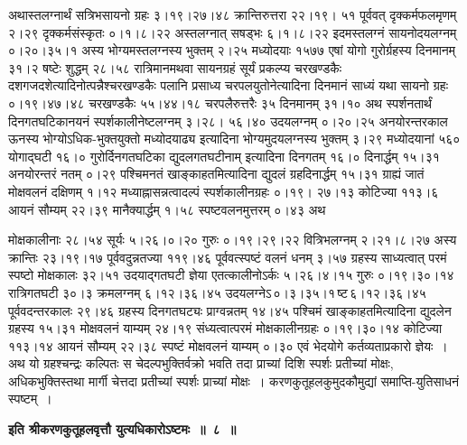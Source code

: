 \documentclass[11pt, openany]{book}
\begin{document}
\begin{sloppypar}
\noindent अथास्तलग्नार्थं सत्रिभसायनो ग्रहः ३।१९।२७।४८ क्रान्तिरुत्तरा २२।१९। ५१ पूर्ववत् दृक्कर्मफलमृणम् २।२९ दृक्कर्मसंस्कृतः ०।१।८।२२ अस्तलग्नात् सषड्भः ६।१।८।२२ इदमस्तलग्नं सायनोदयलग्नम् ०।२०।३५।१ अस्य भोग्यमस्तलग्नस्य भुक्तम् २।२५ मध्योदयाः १५७७ एषां योगो गुरोर्ग्रहस्य दिनमानम् ३१।२ षष्टेः शुद्धम् २८।५८ रात्रिमानमथवा सायनग्रहं सूर्यं प्रकल्प्य चरखण्डकैः दशगजदशेत्यादिनोत्पन्नैश्चरखण्डकैः पलानि प्रसाध्य चरपलयुतोनेत्यादिना दिनमानं साध्यं यथा सायनो ग्रहः ०।१९।४७।४८ चरखण्डकैः ५५।४४।१८ चरपलैरुत्तरैः ३५ दिनमानम् ३१।१० अथ स्पर्शनतार्थं दिनगतघटिकानयनं स्पर्शकालीनेष्टलग्नम् ३।२८। ५६।४० उदयलग्नम् ०।२०।२५ अनयोरन्तरकाल ऊनस्य भोग्योऽधिक-भुक्तयुक्तो मध्योदयाढ्य इत्यादिना भोग्यमुदयलग्नस्य भुक्तम् ३।२९ मध्योदयानां ५६० योगाद्घटी १६।० गुरोर्दिनगतघटिका द्युदलगतघटीनाम् इत्यादिना दिनगतम् १६।० दिनार्द्धम् १५।३१ अनयोरन्तरं नतम् ०।२९ पश्चिमनतं खाङ्काहतमित्यादिना द्युदलं ग्रहदिनार्द्धम् १५।३१ ग्राह्यं जातं मोक्षवलनं दक्षिणम् १।१२ मध्याह्नासन्नत्वादल्पं स्पर्शकालीनग्रहः ०।१९। २७।१३ कोटिज्या ११३।६ आयनं सौम्यम् २२।३९ मानैक्यार्द्धम् १।५८ स्पष्टवलनमुत्तरम् ०।४३ अथ
\end{sloppypar}

\newpage

\begin{sloppypar}
\noindent मोक्षकालीनाः २८।५४ सूर्यः ५।२६।०।२० गुरुः ०।१९।२९।२२ वित्रिभलग्नम् २।२१।८।२७ अस्य क्रान्तिः २३।१९।१७ पूर्ववदुन्नतज्या ११९।४६ पूर्ववत्स्पष्टं वलनं धनम् ३।५७ ग्रहस्य साध्यत्वात् परमं स्पष्टो मोक्षकालः ३२।५१ उदयाद्गतघटी ज्ञेया एतत्कालीनोऽर्कः ५।२६।४।१५ गुरुः ०।१९।३०।१४ रात्रिगतघटी ३०।३ क्रमलग्नम् ६।१२।३६।४५ उदयलग्नेऽ\textendash \,०।३।३५।१\textendash \,ष्ट\textendash \,६।१२।३६।४५\textendash \,पूर्ववदन्तरकालः २९।४६ ग्रहस्य दिनगतघट्यः प्राग्वन्नतम् १४।४५ पश्चिमं खाङ्काहतमित्यादिना द्युदलेन ग्रहस्य १५।३१ मोक्षवलनं याम्यम् २४।१९ संध्यत्वात्परमं मोक्षकालीनग्रहः ०।१९।३०।१४ कोटिज्या ११३।१४ आयनं सौम्यम् २२।३८ स्पष्टं मोक्षवलनं याम्यम् ०।३० एवं भेदयोगे कर्तव्यताप्रकारो ज्ञेयः~। अथ यो ग्रहश्चन्द्रः कल्पितः स चेदल्पभुक्तिर्वक्रो भवति तदा प्राच्यां दिशि स्पर्शः प्रतीच्यां मोक्षः, अधिकभुक्तिस्तथा मार्गी चेत्तदा प्रतीच्यां स्पर्शः प्राच्यां मोक्षः~। करणकुतूहलकुमुदकौमुद्यां समाप्ति-युतिसाधनं स्पष्टम्~।
\end{sloppypar}
\vspace{2mm}

\begin{center}
{\large \textbf{इति श्रीकरणकुतूहलवृत्तौ युत्यधिकारोऽष्टमः~॥~८~॥}}
\end{center}
\vspace{2mm}
\end{document}
